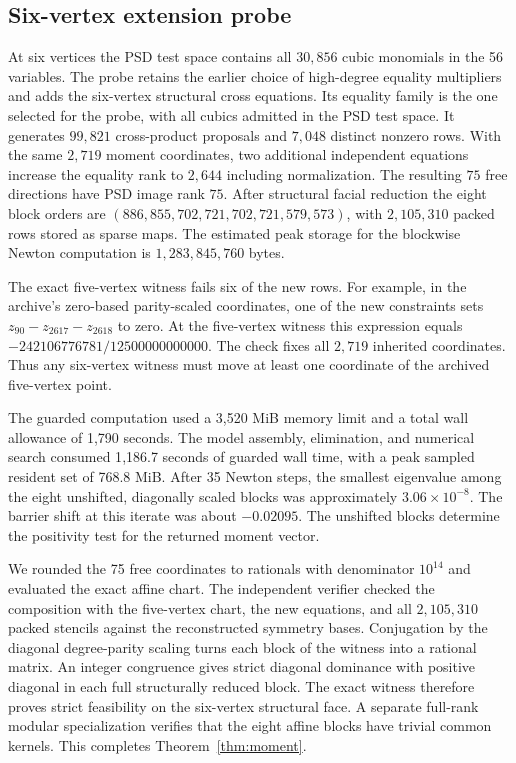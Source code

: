 \subsection{Six-vertex extension probe}\label{sec:six}

At six vertices the PSD test space contains all $30{,}856$ cubic monomials in the 56 variables. The probe retains the earlier choice of high-degree equality multipliers and adds the six-vertex structural cross equations. Its equality family is the one selected for the probe, with all cubics admitted in the PSD test space. It generates $99{,}821$ cross-product proposals and $7{,}048$ distinct nonzero rows. With the same $2{,}719$ moment coordinates, two additional independent equations increase the equality rank to $2{,}644$ including normalization. The resulting $75$ free directions have PSD image rank $75$. After structural facial reduction the eight block orders are $(886,855,702,721,702,721,579,573)$, with $2{,}105{,}310$ packed rows stored as sparse maps. The estimated peak storage for the blockwise Newton computation is $1{,}283{,}845{,}760$ bytes.

The exact five-vertex witness fails six of the new rows. For example, in the archive's zero-based parity-scaled coordinates, one of the new constraints sets $z_{90}-z_{2617}-z_{2618}$ to zero. At the five-vertex witness this expression equals $-242106776781/12500000000000$. The check fixes all $2{,}719$ inherited coordinates. Thus any six-vertex witness must move at least one coordinate of the archived five-vertex point.

The guarded computation used a 3{,}520 MiB memory limit and a total wall allowance of 1{,}790 seconds. The model assembly, elimination, and numerical search consumed 1{,}186.7 seconds of guarded wall time, with a peak sampled resident set of 768.8 MiB. After 35 Newton steps, the smallest eigenvalue among the eight unshifted, diagonally scaled blocks was approximately $3.06\times 10^{-8}$. The barrier shift at this iterate was about $-0.02095$. The unshifted blocks determine the positivity test for the returned moment vector.

We rounded the 75 free coordinates to rationals with denominator $10^{14}$ and evaluated the exact affine chart. The independent verifier checked the composition with the five-vertex chart, the new equations, and all $2{,}105{,}310$ packed stencils against the reconstructed symmetry bases. Conjugation by the diagonal degree-parity scaling turns each block of the witness into a rational matrix. An integer congruence gives strict diagonal dominance with positive diagonal in each full structurally reduced block. The exact witness therefore proves strict feasibility on the six-vertex structural face. A separate full-rank modular specialization verifies that the eight affine blocks have trivial common kernels. This completes Theorem~\ref{thm:moment}.
